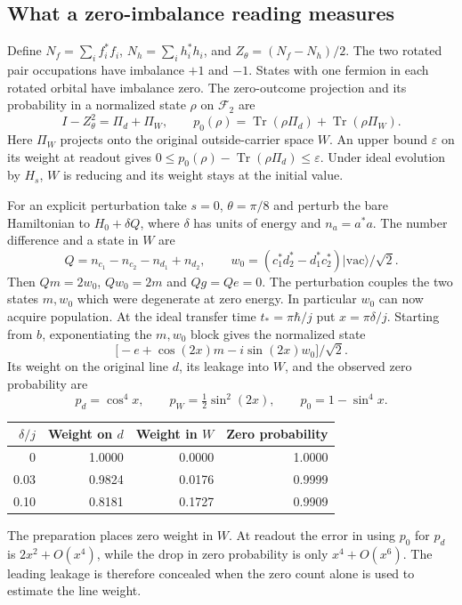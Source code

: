 \documentclass[11pt]{article}
\theoremstyle{definition}
\DeclareMathOperator{\Tr}{Tr}
\newcommand{\ket}[1]{\lvert #1\rangle}
\begin{document}
\subsection{What a zero-imbalance reading measures}

Define $N_f=\sum_i f_i^*f_i$, $N_h=\sum_i h_i^*h_i$, and $Z_\theta=(N_f-N_h)/2$. The two rotated pair occupations have imbalance $+1$ and $-1$. States with one fermion in each rotated orbital have imbalance zero. The zero-outcome projection and its probability in a normalized state $\rho$ on $\mathcal F_2$ are
\begin{equation}
 I-Z_\theta^2=\Pi_d+\Pi_W,\qquad
 p_0(\rho)=\Tr(\rho \Pi_d)+\Tr(\rho \Pi_W).
 \label{eq:pair-ambient-zero}
\end{equation}
Here $\Pi_W$ projects onto the original outside-carrier space $W$. An upper bound $\varepsilon$ on its weight at readout gives $0\leq p_0(\rho)-\Tr(\rho \Pi_d)\leq\varepsilon$. Under ideal evolution by $H_s$, $W$ is reducing and its weight stays at the initial value.

For an explicit perturbation take $s=0$, $\theta=\pi/8$ and perturb the bare Hamiltonian to $H_0+\delta Q$, where $\delta$ has units of energy and $n_a=a^*a$. The number difference and a state in $W$ are
\[
 Q=n_{c_1}-n_{c_2}-n_{d_1}+n_{d_2},\qquad
 w_0=(c_1^*d_2^*-d_1^*c_2^*)\ket{\mathrm{vac}}/\sqrt2 .
\]
Then $Qm=2w_0$, $Qw_0=2m$ and $Qg=Qe=0$. The perturbation couples the two states $m,w_0$ which were degenerate at zero energy. In particular $w_0$ can now acquire population. At the ideal transfer time $t_*=\pi\hbar/j$ put $x=\pi\delta/j$. Starting from $b$, exponentiating the $m,w_0$ block gives the normalized state
\[
 \bigl[-e+\cos(2x)m-i\sin(2x)w_0\bigr]/\sqrt2 .
\]
Its weight on the original line $d$, its leakage into $W$, and the observed zero probability are
\begin{equation}
 p_d=\cos^4 x,\qquad p_W=\tfrac12\sin^2(2x),\qquad p_0=1-\sin^4x .
 \label{eq:pair-leakage-readout}
\end{equation}
\begin{center}
\begin{tabular}{@{}rrrr@{}}\toprule
$\delta/j$ & Weight on $d$ & Weight in $W$ & Zero probability\\\midrule
0 & 1.0000 & 0.0000 & 1.0000\\
0.03 & 0.9824 & 0.0176 & 0.9999\\
0.10 & 0.8181 & 0.1727 & 0.9909\\\bottomrule
\end{tabular}
\end{center}
The preparation places zero weight in $W$. At readout the error in using $p_0$ for $p_d$ is $2x^2+O(x^4)$, while the drop in zero probability is only $x^4+O(x^6)$. The leading leakage is therefore concealed when the zero count alone is used to estimate the line weight.
\end{document}
